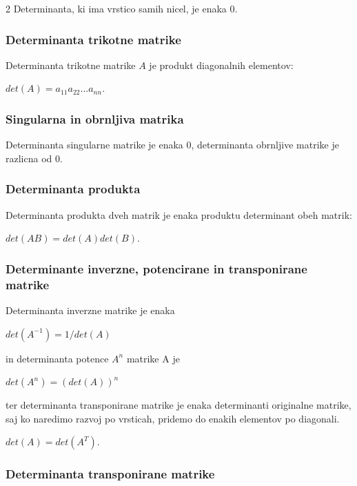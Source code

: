 \documentclass{article}
\begin{document}
\begin{multicols}{2}
	Determinanta, ki ima vrstico samih nicel, je enaka 0.

	\subsubsection{Determinanta trikotne matrike}

	Determinanta trikotne matrike $A$ je produkt diagonalnih elementov:
	\begin{center}
		$det(A) = a_{11}a_{22} \hdots a_{nn}$.
	\end{center}

	\subsubsection{Singularna in obrnljiva matrika}

	Determinanta singularne matrike je enaka 0, determinanta obrnljive matrike je razlicna od 0.

	\subsubsection{Determinanta produkta}

	Determinanta produkta dveh matrik je enaka produktu determinant obeh matrik:
	\begin{center}
		$det(AB) = det(A)det(B)$.
	\end{center}

	\subsubsection{Determinante inverzne, potencirane in transponirane matrike}

	Determinanta inverzne matrike je enaka
	\begin{center}
		$det(A^{-1}) = 1/det(A)$
	\end{center}
	in determinanta potence $A^{n}$ matrike A je
	\begin{center}
		$det(A^{n}) = (det(A))^{n}$
	\end{center}
	ter determinanta transponirane matrike je enaka determinanti originalne matrike,
	saj ko naredimo razvoj po vrsticah, pridemo do enakih elementov po diagonali.
	\begin{center}
		$det(A) = det(A^{T})$.
	\end{center}

	\subsubsection{Determinanta transponirane matrike}


\end{multicols}
\end{document}
